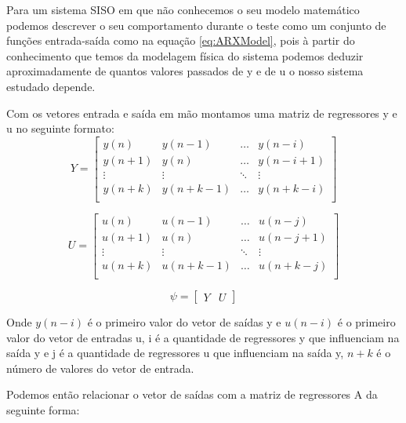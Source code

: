 Para um sistema SISO em que não conhecemos o seu modelo matemático podemos descrever o seu comportamento durante o teste como um conjunto de funções entrada-saída como na equação \eqref{eq:ARXModel}, pois à partir do conhecimento que temos da modelagem física do sistema podemos deduzir aproximadamente de quantos valores passados de y e de u o nosso sistema estudado depende.


Com os vetores entrada e saída em mão montamos uma matriz de regressores y e u no seguinte formato:
\begin{equation}
Y=\begin{bmatrix}
y(n) & y(n-1) & \dots & y(n-i) \\
y(n+1) & y(n) & \dots & y(n-i+1) \\
\vdots & \vdots & \ddots & \vdots\\
y(n+k) & y(n+k-1) & \dots & y(n+k-i) \\
\end{bmatrix}
\end{equation}

\begin{equation}
U=\begin{bmatrix}
 u(n) & u(n-1) & \dots & u(n-j)\\
 u(n+1) & u(n) & \dots & u(n-j+1)\\
 \vdots & \vdots & \ddots  & \vdots\\
 u(n+k) & u(n+k-1) & \dots & u(n+k-j)\\
\end{bmatrix}
\end{equation}

\begin{equation}\label{eq:regressores}
\psi=
\begin{bmatrix}
Y & U
\end{bmatrix}
\end{equation}

Onde $y(n-i)$ é o primeiro valor do vetor de saídas y e $u(n-i)$ é o primeiro valor do vetor de entradas u, i é a quantidade de regressores y que influenciam na saída y e j é a quantidade de regressores u que influenciam na saída y, $n+k$ é o número de valores do vetor de entrada.



Podemos então relacionar o vetor de saídas com a matriz de regressores A da seguinte forma:

